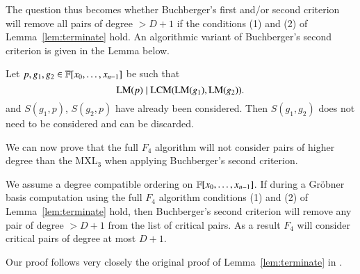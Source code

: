 The question thus becomes whether Buchberger's first and/or second criterion will remove all pairs of degree $>D+1$ if the conditions (1) and (2) of Lemma~\ref{lem:terminate} hold. An algorithmic variant of Buchberger's second criterion is given in the Lemma below.
\begin{lemma}
Let $p, g_1,g_2 \in  {{{\mathbb F}}[x_0,\ldots,x_{n-1}]}$  be
such that $$\textsc{LM}(p) \mid  \textsc{LCM}( \textsc{LM}(g_1), \textsc{LM}(g_2)).$$ and $S(g_1, p)$, $S(g_2,p)$ have already been considered. Then $S(g_1, g_2)$ does not need to be considered and can be discarded.
\end{lemma}
We can now prove that the full $F_4$ algorithm will not consider pairs of higher degree than the MXL$_3$ 
when applying Buchberger's second criterion.
\begin{proposition}
We assume a degree compatible ordering on ${{{\mathbb F}}[x_0,\ldots,x_{n-1}]}$.
If during a Gr\"obner basis computation using the full $F_4$ algorithm 
conditions (1) and (2) of Lemma~\ref{lem:terminate} hold, then Buchberger's second criterion will remove any pair of degree $> D+1$ from the list of critical pairs. As a result $F_4$ will consider critical pairs of degree at most $D+1$.
\end{proposition}
Our proof follows very closely the original proof of Lemma~\ref{lem:terminate} in \cite{mxl3}.
